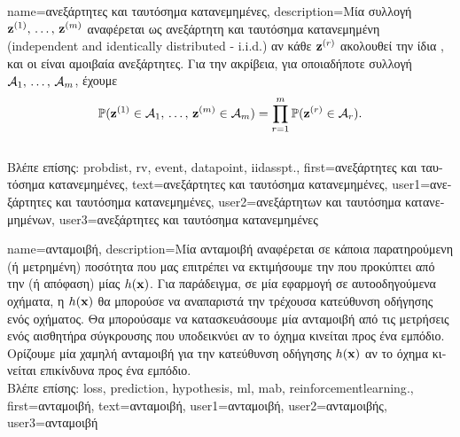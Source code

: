 {name={\foreignlanguage{greek}{ανεξάρτητες και ταυτόσημα κατανεμημένες}}, 
	description={\foreignlanguage{greek}{Μία συλλογή}  ${\bf z}^{(1)}, \,\ldots, \,{\bf z}^{(m)}$ 
		\foreignlanguage{greek}{αναφέρεται ως ανεξάρτητη και ταυτόσημα κατανεμημένη}
		(independent and identically distributed - i.i.d.) 
		\foreignlanguage{greek}{αν κάθε ${\bf z}^{(r)}$ ακολουθεί την ίδια} ,  
		\foreignlanguage{greek}{και οι}  \foreignlanguage{greek}{είναι αμοιβαία ανεξάρτητες. 
		Για την ακρίβεια, για οποιαδήποτε συλλογή}  $\mathcal{A}_1, \,\ldots, \,\mathcal{A}_m$, 
		\foreignlanguage{greek}{έχουμε}
       		\[
          		\mathbb{P}({ {\bf z}^{(1)} \in \mathcal{A}_1, \,\ldots, \,{\bf z}^{(m)} \in \mathcal{A}_{m}}) 
         		= \prod_{r=1}^{m} \mathbb{P}({ {\bf z}^{(r)} \in \mathcal{A}_r}).
         	\] \\
		\foreignlanguage{greek}{Βλέπε επίσης:} \gls{probdist}, \gls{rv}, \gls{event}, \gls{datapoint}, \gls{iidasspt}.},
	first={\foreignlanguage{greek}{ανεξάρτητες και ταυτόσημα κατανεμημένες}},
	text={\foreignlanguage{greek}{ανεξάρτητες και ταυτόσημα κατανεμημένες}},
	user1={\foreignlanguage{greek}{ανεξάρτητες και ταυτόσημα κατανεμημένες}}, %
  	user2={\foreignlanguage{greek}{ανεξάρτητων και ταυτόσημα κατανεμημένων}}, %
	user3={\foreignlanguage{greek}{ανεξάρτητες και ταυτόσημα κατανεμημένες}} %
}

{name={\foreignlanguage{greek}{ανταμοιβή}}, 
	description={\foreignlanguage{greek}{Μία ανταμοιβή αναφέρεται σε κάποια παρατηρούμενη}  
		\foreignlanguage{greek}{(ή μετρημένη) ποσότητα που μας επιτρέπει να εκτιμήσουμε την}   
		\foreignlanguage{greek}{που προκύπτει από την}  \foreignlanguage{greek}{(ή απόφαση) μίας}  
		$h({\bf x})$. \foreignlanguage{greek}{Για παράδειγμα, σε μία εφαρμογή}  
		 \foreignlanguage{greek}{σε αυτοοδηγούμενα οχήματα, η $h({\bf x})$ θα μπορούσε να αναπαριστά την τρέχουσα  
		κατεύθυνση οδήγησης ενός οχήματος. Θα μπορούσαμε να κατασκευάσουμε μία ανταμοιβή από τις μετρήσεις 
		ενός αισθητήρα σύγκρουσης που υποδεικνύει αν το όχημα κινείται προς ένα εμπόδιο. Ορίζουμε μία χαμηλή ανταμοιβή για την 
		κατεύ\-θυνση οδήγησης $h({\bf x})$ αν το όχημα κινείται επικίνδυνα προς ένα εμπόδιο.} \\
		\foreignlanguage{greek}{Βλέπε επίσης:} \gls{loss}, \gls{prediction}, \gls{hypothesis}, \gls{ml}, \gls{mab}, \gls{reinforcementlearning}.},
	first={\foreignlanguage{greek}{ανταμοιβή}}, 
	text={\foreignlanguage{greek}{ανταμοιβή}},
	user1={\foreignlanguage{greek}{ανταμοιβή}}, %
	user2={\foreignlanguage{greek}{ανταμοιβής}}, %
	user3={\foreignlanguage{greek}{ανταμοιβή}} %
} 

